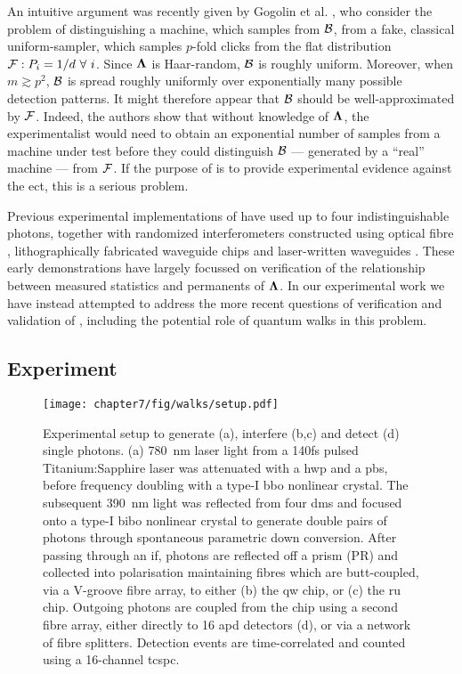 An intuitive argument was recently given by Gogolin et al. \cite{Gogolin2013},  who consider the problem of distinguishing a \bosonsampling machine, which samples from $\mathcal{B}$, from a fake, classical uniform-sampler, which samples $p$-fold clicks from the flat distribution $\mathcal{F}: P_i = 1/d ~\forall~ i$.  Since $\mathbf{\Lambda}$ is Haar-random, $\mathcal{B}$ is roughly uniform. Moreover, when $m\gtrsim p^2$, $\mathcal{B}$ is spread roughly uniformly over exponentially many possible detection patterns. It might therefore appear that $\mathcal{B}$ should be well-approximated by $\mathcal{F}$.  Indeed, the authors show that without knowledge of $\mathbf{\Lambda}$, the experimentalist would need to obtain an exponential number of samples from a machine under test before they could distinguish $\mathcal{B}$ ---  generated by a ``real'' \bosonsampling machine --- from $\mathcal{F}$.  If the purpose of \bosonsampling is to provide experimental evidence against the \gls{ect}, this is a serious problem.

Previous experimental implementations of \bosonsampling have used up to four indistinguishable photons, together with randomized interferometers constructed using optical fibre \cite{Broome2013}, lithographically fabricated waveguide chips \cite{Spring2013} and laser-written waveguides \cite{Crespi2013, Tillmann2013}. These early demonstrations have largely focussed on verification of the relationship between measured statistics and permanents of $\mathbf{\Lambda}$.  In our experimental work we have instead attempted to address the more recent questions of verification and validation of \bosonsampling, including the potential role of quantum walks in this problem.

\subsection{Experiment} 
\begin{figure}[t!]
\texttt{[image: chapter7/fig/walks/setup.pdf]}
\caption[Experimental setup]{Experimental setup to generate (a), interfere (b,c) and detect (d) single photons. (a) \SI{780}{nm} laser light from a 140fs pulsed Titanium:Sapphire laser was attenuated with a \gls{hwp} and a \gls{pbs}, before frequency doubling with a type-I \gls{bbo} nonlinear crystal.  The subsequent \SI{390}{nm} light was reflected from four \glspl{dm} and focused onto a type-I \gls{bibo} nonlinear crystal to generate double pairs of photons through spontaneous parametric down conversion.  After passing through an \gls{if}, photons are reflected off a prism (PR) and collected into polarisation maintaining fibres which are butt-coupled, via a V-groove fibre array, to either (b) the \gls{qw} chip, or (c) the \gls{ru} chip. Outgoing photons are coupled from the chip using a second fibre array, either directly to 16 \gls{apd} detectors (d), or via a network of fibre splitters. Detection events are time-correlated and counted using a 16-channel \gls{tcspc}.
}
\label{fig:setup}
\end{figure}

